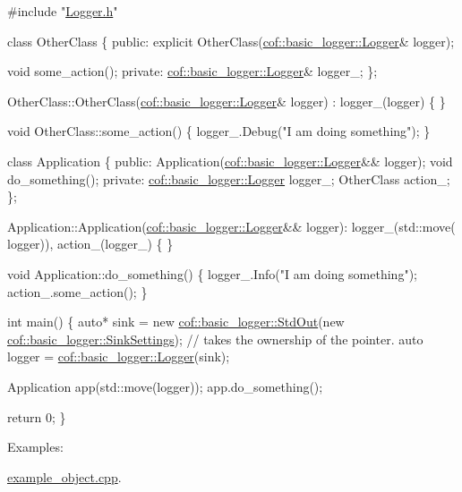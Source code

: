 \begin{DoxyCodeInclude}

\textcolor{preprocessor}{#include "\hyperlink{_logger_8h}{Logger.h}"}

\textcolor{keyword}{class }OtherClass
\{
\textcolor{keyword}{public}:
    \textcolor{keyword}{explicit} OtherClass(\hyperlink{classcof_1_1basic__logger_1_1_logger}{cof::basic\_logger::Logger}& logger);

    \textcolor{keywordtype}{void} some\_action();
\textcolor{keyword}{private}:
    \hyperlink{classcof_1_1basic__logger_1_1_logger}{cof::basic\_logger::Logger}& logger\_;
\};

OtherClass::OtherClass(\hyperlink{classcof_1_1basic__logger_1_1_logger}{cof::basic\_logger::Logger}& logger) : logger\_(logger)
\{
\}

\textcolor{keywordtype}{void} OtherClass::some\_action()
\{
    logger\_.Debug(\textcolor{stringliteral}{"I am doing something"});
\}

\textcolor{keyword}{class }Application
\{
\textcolor{keyword}{public}:
    Application(\hyperlink{classcof_1_1basic__logger_1_1_logger}{cof::basic\_logger::Logger}&& logger);
    \textcolor{keywordtype}{void} do\_something();
\textcolor{keyword}{private}:
    \hyperlink{classcof_1_1basic__logger_1_1_logger}{cof::basic\_logger::Logger} logger\_;
    OtherClass action\_;
\};

Application::Application(\hyperlink{classcof_1_1basic__logger_1_1_logger}{cof::basic\_logger::Logger}&& logger): logger\_(std::move(
      logger)), action\_(logger\_)
\{
\}

\textcolor{keywordtype}{void} Application::do\_something()
\{
    logger\_.Info(\textcolor{stringliteral}{"I am doing something"});
    action\_.some\_action();
\}



\textcolor{keywordtype}{int} main()
\{
    \textcolor{keyword}{auto}* sink = \textcolor{keyword}{new} \hyperlink{classcof_1_1basic__logger_1_1_std_out}{cof::basic\_logger::StdOut}(\textcolor{keyword}{new} 
      \hyperlink{structcof_1_1basic__logger_1_1_sink_settings}{cof::basic\_logger::SinkSettings});
    \textcolor{comment}{// takes the ownership of the pointer.}
    \textcolor{keyword}{auto} logger = \hyperlink{classcof_1_1basic__logger_1_1_logger}{cof::basic\_logger::Logger}(sink);

    Application app(std::move(logger));
    app.do\_something();

    \textcolor{keywordflow}{return} 0;
\}
\end{DoxyCodeInclude}
 \begin{Desc}
\item[Examples\+: ]\par
\hyperlink{example_object_8cpp-example}{example\+\_\+object.\+cpp}.\end{Desc}


